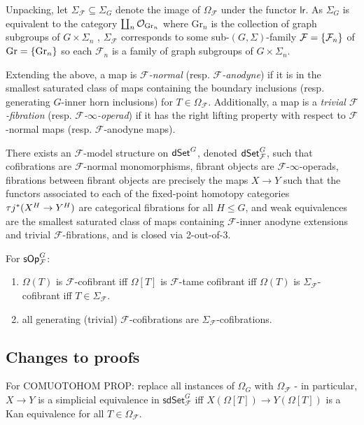 \documentclass[a4paper,10pt
,draft
]{article}%
\renewcommand{\F}{\mathcal F}
\renewcommand{\1}{\eta}%
\begin{document}
Unpacking, let $\Sigma_\F \subseteq \Sigma_G$ denote the image of $\Omega_\F$ under the functor $\mathsf{lr}$.
As $\Sigma_G$ is equivalent to the category $\coprod_n \mathcal{O}_{\mathrm{Gr}_n}$
where $\mathrm{Gr}_n$ is the collection of graph subgroups of $G \times \Sigma_n$ ,
$\Sigma_\F$ corresponds to some sub-$(G, \Sigma)$-family $\F = \set{\F_n}$ of $\mathrm{Gr} = \left\{\mathrm{Gr}_n\right\}$
so each $\F_n$ is a family of graph subgroups of $G \times \Sigma_n$.      

Extending the above, a map is \textit{$\F$-normal} (resp. \textit{$\F$-anodyne})
if it is in the smallest saturated class of maps containing the
boundary inclusions (resp. generating $G$-inner horn inclusions) for $T \in \Omega_\F$.
Additionally, a map is a \textit{trivial $\F$-fibration} (resp. \textit{$\F$-$\infty$-operad}) if it has the right lifting property with respect to $\F$-normal maps (resp. $\F$-anodyne maps).

\begin{theorem}
      There exists an $\F$-model structure on $\mathsf{dSet}^G$, denoted $\dSet^G_\F$, such that
      cofibrations are $\F$-normal monomorphisms,
      fibrant objects are $\F$-$\infty$-operads,
      fibrations between fibrant objects are precisely the maps $X \to Y$ such that the functors associated to each of the fixed-point homotopy categories $\tau j^{\**}(X^H \to Y^H)$ are categorical fibrations for all $H \leq G$,
      and weak equivalences are the smallest saturated class of maps containing $\F$-inner anodyne extensions and trivial $\F$-fibrations, and is closed via 2-out-of-3.
\end{theorem}


For $\sOp^G_\F$:
\begin{enumerate}
\item $\Omega(T)$ is $\F$-cofibrant iff $\Omega[T]$ is $\F$-tame cofibrant iff $\Omega(T)$ is $\Sigma_\F$-cofibrant iff $T \in \Sigma_\F$.
\item all generating (trivial) $\F$-cofibrations are $\Sigma_\F$-cofibrations.
\end{enumerate}


\subsection{Changes to proofs}



For COMUOTOHOM PROP: replace all instances of $\Omega_G$ with $\Omega_{\mathcal F}$ - in particular, $X \to Y$ is a simplicial equivalence in $\mathsf{sdSet}^G_{\mathcal F}$ iff $X(\Omega[T]) \to Y(\Omega[T])$ is a Kan equivalence for all $T \in \Omega_{\mathcal F}$. 
\end{document}
